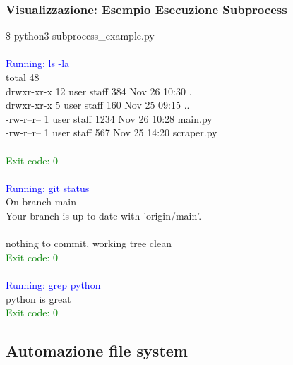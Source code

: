 \subsubsection{Visualizzazione: Esempio Esecuzione Subprocess}

\begin{center}
\begin{tcolorbox}[title=Terminal Output: subprocess.run(), colback=black!5, coltitle=white, colbacktitle=blue!50!black, width=0.95\textwidth, fonttitle=\bfseries\ttfamily, fontupper=\small\ttfamily]
\$ python3 subprocess\_example.py\\
\\
\textcolor{blue}{Running: ls -la}\\
total 48\\
drwxr-xr-x  12 user  staff   384 Nov 26 10:30 .\\
drwxr-xr-x   5 user  staff   160 Nov 25 09:15 ..\\
-rw-r--r--   1 user  staff  1234 Nov 26 10:28 main.py\\
-rw-r--r--   1 user  staff   567 Nov 25 14:20 scraper.py\\
\\
\textcolor{green}{Exit code: 0}\\
\\
\textcolor{blue}{Running: git status}\\
On branch main\\
Your branch is up to date with 'origin/main'.\\
\\
nothing to commit, working tree clean\\
\textcolor{green}{Exit code: 0}\\
\\
\textcolor{blue}{Running: grep python}\\
python is great\\
\textcolor{green}{Exit code: 0}
\end{tcolorbox}
\end{center}

\subsection{Automazione file system}

